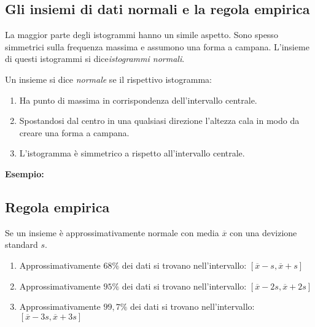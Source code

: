 \documentclass{article}
\begin{document}
\subsection*{Gli insiemi di dati normali e la regola empirica}

La maggior parte degli istogrammi hanno un simile aspetto. Sono spesso simmetrici sulla frequenza massima e assumono una forma a campana. L'insieme di questi istogrammi si dice\textit{istogrammi normali}.  

\begin{tcolorbox}
Un insieme si dice \textit{normale} se il rispettivo istogramma:
\begin{enumerate}
  \item Ha punto di massima in corrispondenza dell'intervallo centrale.
  \item Spostandosi dal centro in una qualsiasi direzione l'altezza cala in modo da creare una forma a campana.
  \item L'istogramma è simmetrico a rispetto all'intervallo centrale.
\end{enumerate}
 
  \textbf{Esempio:} 


\end{tcolorbox}

\subsection*{Regola empirica}

Se un insieme è approssimativamente normale con media $\overline{x}$ con una devizione standard $s$.

\begin{enumerate}
  \item Approssimativamente $68\%$ dei dati si trovano nell'intervallo: $[\overline{x}-s,\overline{x}+s]$
  \item Approssimativamente $95\%$ dei dati si trovano nell'intervallo: $[\overline{x}-2s,\overline{x}+2s]$
  \item Approssimativamente $99,7\%$ dei dati si trovano nell'intervallo: $[\overline{x}-3s,\overline{x}+3s]$

\end{enumerate}
\end{document}
